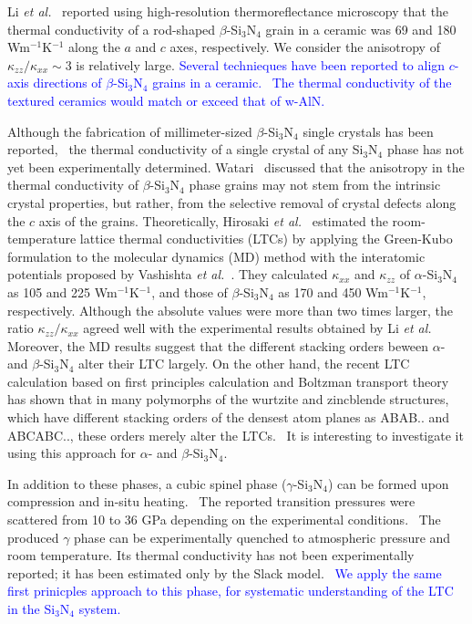 \documentclass[twocolumn,amsmath,amssymb,a4paper,prb,superscriptaddress,floatfix]{revtex4-1}
\begin{document}
Li {\it et al.}~\cite{li} reported using high-resolution thermoreflectance
microscopy that the thermal conductivity of a rod-shaped $\beta$-Si$_3$N$_4$
grain in a ceramic was 69 and 180 Wm$^{-1}$K$^{-1}$ along the $a$ and $c$ axes,
respectively. We consider the anisotropy of $\kappa_{zz}/\kappa_{xx}\sim 3$ is
relatively large.  \textcolor {blue}{Several technieques have been reported to align $c$-axis
directions of $\beta$-Si$_3$N$_4$ grains in a 
ceramic.~\cite{takahashi,hirao,zhu,akimine}  The thermal conductivity of
the textured ceramics would match or exceed that of
w-AlN.} 

Although the fabrication of millimeter-sized $\beta$-Si$_3$N$_4$ single
crystals has been reported,~\cite{yamamoto} the thermal conductivity of a
single crystal of any Si$_3$N$_4$ phase has not yet been
experimentally determined.  Watari~\cite{watari-trans} discussed that the anisotropy in the thermal
conductivity of $\beta$-Si$_3$N$_4$ phase grains may not stem from the
intrinsic crystal properties, but rather, from the selective removal of crystal
defects along the $c$ axis of the grains. Theoretically,
Hirosaki {\it et al.}~\cite{hirosaki-md} estimated the room-temperature lattice
thermal conductivities (LTCs)  by
applying the Green-Kubo formulation to the molecular dynamics (MD) method with
the interatomic potentials proposed by Vashishta {\it et al.}~\cite{vashishta}. 
They calculated $\kappa$$_{xx}$ and $\kappa$$_{zz}$ of
$\alpha$-Si$_3$N$_4$ as 105 and 225 Wm$^{-1}$K$^{-1}$, and those of
$\beta$-Si$_3$N$_4$ as 170 and 450 Wm$^{-1}$K$^{-1}$, respectively.
Although the absolute values were more than two times larger, the ratio $\kappa_{zz}/\kappa_{xx}$
agreed well with the experimental results obtained by Li {\it et al.}~\cite{li} Moreover, the MD
results suggest that the different stacking orders beween $\alpha$- and
$\beta$-Si$_3$N$_4$ alter their LTC largely. On the other hand, the recent LTC
calculation based on first principles calculation and Boltzman transport theory
has shown that in many polymorphs of the wurtzite and zincblende structures,
which have different stacking orders of the densest atom planes as ABAB.. and
ABCABC.., these orders merely alter the LTCs.~\cite{phono3py} It is interesting
to investigate it using this approach for $\alpha$- and $\beta$-Si$_3$N$_4$. 

In addition to these phases, a cubic spinel phase ($\gamma$-Si$_3$N$_4$) can be
formed upon compression and in-situ heating.~\cite{zerr,zhang} The reported
transition pressures were scattered from 10 to 36 GPa depending on the
experimental conditions.~\cite{xu}  The produced $\gamma$ phase can be
experimentally quenched to atmospheric pressure and room temperature.  Its
thermal conductivity has not been experimentally reported; it has been
estimated only by the Slack model.~\cite{morelli} \textcolor {blue}{We apply
the same first prinicples approach to this phase, for systematic
understanding of the LTC in the Si$_3$N$_4$ system.}
\end{document}
